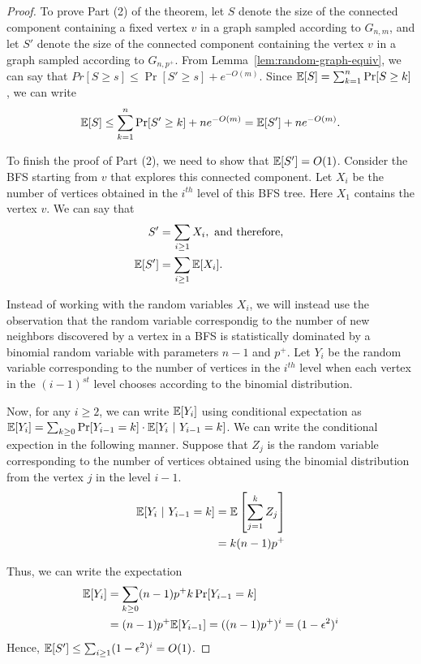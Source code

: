 \begin{proof}
  To prove Part (2) of the theorem, let $S$ denote the size of the connected
  component containing a fixed vertex $v$ in a graph sampled according to
  $G_{n,m}$, and let $S'$ denote the size of the connected component containing
  the vertex $v$ in a graph sampled according to $G_{n,p^+}$. From
  Lemma~\ref{lem:random-graph-equiv}, we can say that
  $Pr[S \geq s] \leq \Pr[S' \geq s] + e^{-O(m)}$. Since
  $\mathbb{E}[S] = \sum_{k=1}^n \Pr[S \geq k]$, we can write
  \begin{align*}
    \mathbb{E}[S] \leq \sum_{k=1}^n \Pr[S' \geq k] + ne^{-O(m)} = \mathbb{E}[S'] + ne^{-O(m)}.
  \end{align*}

  To finish the proof of Part (2), we need to show that $\mathbb{E}[S'] =
  O(1)$. Consider the BFS starting from $v$ that explores this connected
  component. Let $X_i$ be the number of vertices obtained in the $i^{th}$ level
  of this BFS tree. Here $X_1$ contains the vertex $v$. We can say that
  \begin{align*}
    S' &= \sum_{i \geq 1} X_i, \text{ and therefore, }\\
    \mathbb{E}[S'] &= \sum_{i \geq 1} \mathbb{E}[X_i].
  \end{align*}

  Instead of working with the random variables $X_i$, we will instead use the
  observation that the random variable correspondig to the number of new
  neighbors discovered by a vertex in a BFS is statistically dominated by a
  binomial random variable with parameters $n-1$ and $p^+$. Let $Y_i$ be the
  random variable corresponding to the number of vertices in the $i^{th}$ level
  when each vertex in the $(i-1)^{st}$ level chooses according to the binomial
  distribution.
  
  Now, for any $i \geq 2$, we can write $\mathbb{E}[Y_i]$ using conditional expectation
  as $\mathbb{E}[Y_i] = \sum_{k \geq 0} \Pr[Y_{i-1} = k]\cdot \mathbb{E}[Y_i ~|~ Y_{i-1} =
  k]$. We can write the conditional expection in the following manner. Suppose
  that $Z_j$ is the random variable corresponding to the number of vertices
  obtained using the binomial distribution from the vertex $j$ in the level $i-1$.
  \begin{align*}
    \mathbb{E}[Y_i ~|~ Y_{i-1} =k] &= \mathbb{E}\left[ \sum_{j=1}^{k} Z_j \right]\\
    &= k(n-1)p^+
  \end{align*}

  Thus, we can write the expectation
  \begin{align*}
    \mathbb{E}[Y_i] &= \sum_{k \geq 0} (n-1)p^+ k\Pr[Y_{i-1}=k]\\
    &= (n-1)p^+\mathbb{E}[Y_{i-1}] = ((n-1)p^+)^i = (1-\epsilon^2)^i
  \end{align*}
  Hence, $\mathbb{E}[S'] \leq \sum_{i\geq 1} (1-\epsilon^2)^i = O(1)$.
\end{proof}

